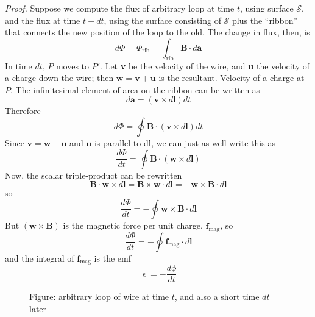 \documentclass[../../../main.tex]{subfiles}
\begin{document}
\emph{Proof.} Suppose we compute the ﬂux of arbitrary loop at time $t$, using surface $\mathcal{S}$, and the ﬂux at time $t + dt$, using the surface consisting of $\mathcal{S}$ plus the “ribbon” that connects the new position of the loop to the old. The change in ﬂux, then, is
\begin{equation*}
    d\Phi=\Phi_\text{rib}=\int_\text{rib} \mathbf{B}\cdot d\mathbf{a}
\end{equation*}
In time $dt$, $P$ moves to $P'$.  Let \textbf{v} be the velocity of the wire, and \textbf{u} the velocity of a charge down the wire; then $\mathbf{w} = \mathbf{v} + \mathbf{u}$ is the resultant. Velocity of a charge at $P$. The inﬁnitesimal element of area on the ribbon can be written as
\begin{equation*}
    d\mathbf{a} = (\mathbf{v} \times d\mathbf{l}) dt
\end{equation*}
Therefore
\begin{equation*}
    d\Phi=\oint\mathbf{B}\cdot  (\mathbf{v} \times d\mathbf{l}) dt
\end{equation*}
Since $\mathbf{v}=\mathbf{w}-\mathbf{u}$ and $\mathbf{u}$ is parallel to d\textbf{l}, we can just as well write this as
\begin{equation*}
    \frac{d\Phi}{dt}=\oint\mathbf{B}\cdot  (\mathbf{w} \times d\mathbf{l})
\end{equation*}
Now, the scalar triple-product can be rewritten
\begin{equation*}
    \mathbf{B}\cdot \mathbf{w}\times d\mathbf{l}=\mathbf{B}\times \mathbf{w}\cdot d\mathbf{l}= -\mathbf{w}\times\mathbf{B} \cdot d\mathbf{l}
\end{equation*}
so
\begin{equation*}
    \frac{d\Phi}{dt}=-\oint\mathbf{w}\times\mathbf{B} \cdot d\mathbf{l}
\end{equation*}
But $(\mathbf{w}\times\mathbf{B} )$ is the magnetic force per unit charge, $\mathbf{f}_\text{mag}$, so
\begin{equation*}
    \frac{d\Phi}{dt}=-\oint\mathbf{f}_\text{mag}\cdot d\mathbf{l}
\end{equation*}
and the integral of $\mathbf{f}_\text{mag}$ is the emf
\begin{equation*}
    \upvarepsilon=-\frac{d\phi}{dt}
\end{equation*}

\begin{figure}
    \centering
    \caption*{Figure:  arbitrary loop of wire at time $t$, and also a short time $dt$ later}
\end{figure}
\end{document}
